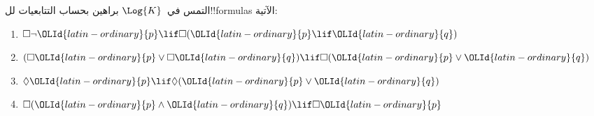 \documentclass[../../../include/open-logic-section]{subfiles}
\begin{document}

\begin{prob}
  التمس في~$\Log{K}$ براهين بحساب التتابعيات لل!!{formula}s الآتية:
  \begin{enumerate}
    \item $\Box \lnot \OLId{latin-ordinary}{p} \lif \Box(\OLId{latin-ordinary}{p} \lif \OLId{latin-ordinary}{q})$
    \item $(\Box \OLId{latin-ordinary}{p} \lor \Box \OLId{latin-ordinary}{q}) \lif \Box(\OLId{latin-ordinary}{p} \lor \OLId{latin-ordinary}{q})$
    \item $\Diamond \OLId{latin-ordinary}{p} \lif \Diamond(\OLId{latin-ordinary}{p} \lor \OLId{latin-ordinary}{q})$
    \item $\Box(\OLId{latin-ordinary}{p} \land \OLId{latin-ordinary}{q}) \lif \Box \OLId{latin-ordinary}{p}$
  \end{enumerate}
\end{prob}
\end{document}
